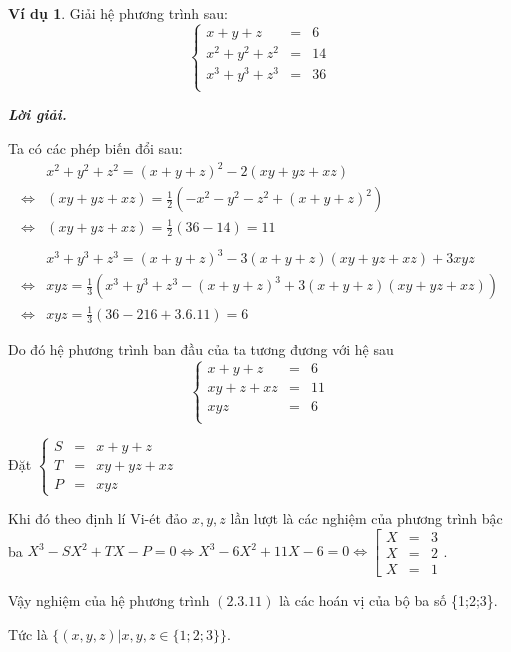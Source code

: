 \documentclass[12pt,a4paper,oneside]{book}
\theoremstyle{theorem}
\theoremstyle{definition}
\newtheorem{vd}[theorem2]{Ví dụ}
\begin{document}
\begin{vd}
     Giải hệ phương trình sau:
    \begin{equation}
\left\{
\begin{array}{lcl}
\displaystyle x+y+z&=&6 \\[1.5ex]
\displaystyle x^2+y^2+z^2&=&14\\[1.5ex]
\displaystyle x^3+y^3+z^3&=&36\\
\end{array}
\right.
 \end{equation}

 \textbf{\textit{Lời giải.}}

Ta có các phép biến đổi sau:
\begin{align*}
    &x^2+y^2+z^2=(x+y+z)^2-2(xy+yz+xz)\\
\Leftrightarrow&(xy+yz+xz)=\displaystyle\frac{1}2\left(-x^2-y^2-z^2+(x+y+z)^2\right)\\
\Leftrightarrow&(xy+yz+xz)=\displaystyle\frac{1}2\left(36-14\right)=11
\\
\\
&x^3+y^3+z^3=(x+y+z)^3-3(x+y+z)(xy+yz+xz)+3xyz\\
\Leftrightarrow&xyz=\displaystyle\frac{1}3\left(x^3+y^3+z^3-(x+y+z)^3+3(x+y+z)(xy+yz+xz)\right)\\
\Leftrightarrow&xyz=\displaystyle\frac{1}3\left(36-216+3.6.11\right)=6\end{align*}

Do đó hệ phương trình ban đầu của ta tương đương với hệ sau
\[\left\{
\begin{array}{lcl}
\displaystyle x+y+z&=&6 \\[1.5ex]
\displaystyle xy+z+xz&=&11\\[1.5ex]
\displaystyle xyz&=&6\\
\end{array}
\right.\]

Đặt $\left\{\begin{array}{lcl}
       S&=&x+y+z  \\
       T&=&xy+yz+xz \\
       P&=&xyz  
    \end{array}\right.$

Khi đó theo định lí Vi-ét đảo $x,y,z$ lần lượt là các nghiệm của phương trình bậc ba $X^3-SX^2+TX-P=0\Leftrightarrow X^3-6X^2+11X-6=0\Leftrightarrow\left[
\begin{array}{lcl}
\displaystyle X&=&\displaystyle 3\\[1.5ex]
\displaystyle X&=&\displaystyle 2\\[1.5ex]
\displaystyle X&=&\displaystyle 1
\end{array}
\right.$.

Vậy nghiệm của hệ phương trình $(2.3.11)$ là các hoán vị của bộ ba số \{1;2;3\}. 

Tức là $\{(x,y,z)|x,y,z\in\{1;2;3\}\}$.
\end{vd}
\end{document}

